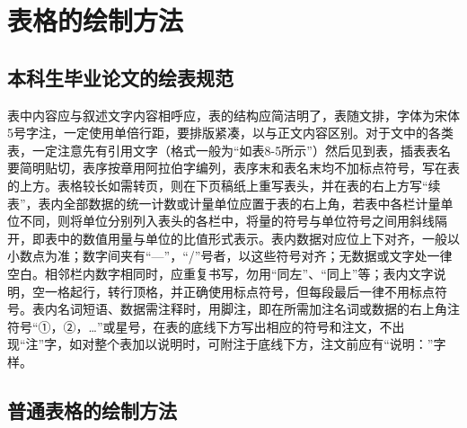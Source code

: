 
\chapter{表格的绘制方法}

\section{本科生毕业论文的绘表规范}

表中内容应与叙述文字内容相呼应，表的结构应简洁明了，表随文排，字体为宋体5号字注，一定使用单倍行距，要排版紧凑，以与正文内容区别。对于文中的各类表，一定注意先有引用文字（格式一般为“如表8-5所示”）然后见到表，插表表名要简明贴切，表序按章用阿拉伯字编列，表序末和表名末均不加标点符号，写在表的上方。表格较长如需转页，则在下页稿纸上重写表头，并在表的右上方写“续表”，表内全部数据的统一计数或计量单位应置于表的右上角，若表中各栏计量单位不同，则将单位分别列入表头的各栏中，将量的符号与单位符号之间用斜线隔开，即表中的数值用量与单位的比值形式表示。表内数据对应位上下对齐，一般以小数点为准；数字间夹有“—”，“/”号者，以这些符号对齐；无数据或文字处一律空白。相邻栏内数字相同时，应重复书写，勿用“同左”、“同上”等；表内文字说明，空一格起行，转行顶格，并正确使用标点符号，但每段最后一律不用标点符号。表内名词短语、数据需注释时，用脚注，即在所需加注名词或数据的右上角注符号“①，②，…”或星号，在表的底线下方写出相应的符号和注文，不出现“注”字，如对整个表加以说明时，可附注于底线下方，注文前应有“说明：”字样。

\section{普通表格的绘制方法}

